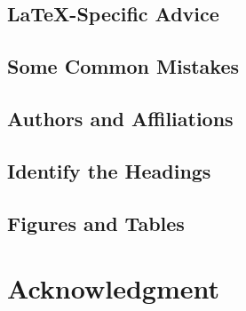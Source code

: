\documentclass[conference]{IEEEtran}
\begin{document}
\subsection{\LaTeX-Specific Advice}

\subsection{Some Common Mistakes}\label{SCM}


\subsection{Authors and Affiliations}

\subsection{Identify the Headings}


\subsection{Figures and Tables}


\section*{Acknowledgment}



\renewcommand\refname{Reference}



\end{document}
